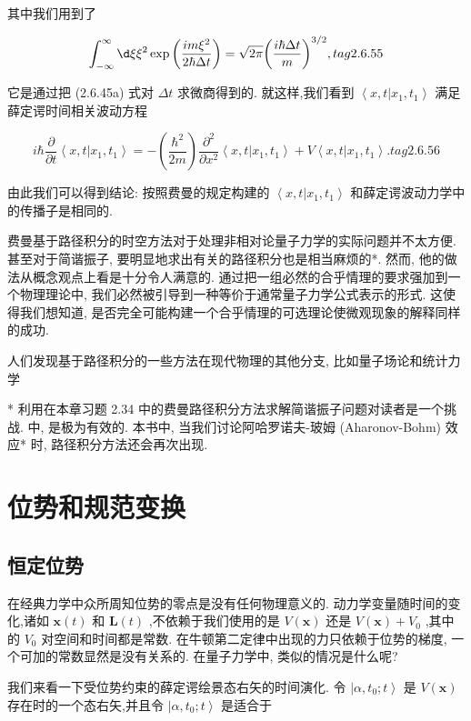 \documentclass[lang=cn,newtx,10pt,scheme=chinese,thmcnt=section]{elegantbook}
\begin{document}
其中我们用到了

$$
\int_{-\infty }^{\infty }{\d \xi }{\xi }^{2}\exp \left( \frac{{im}{\xi }^{2}}{2\hbar {\Delta t}}\right) = \sqrt{2\pi }{\left( \frac{i\hbar {\Delta t}}{m}\right) }^{3/2}, tag{2.6.55}
$$

它是通过把 (2.6.45a) 式对 ${\Delta t}$ 求微商得到的. 就这样,我们看到 $\left\langle {x, t | {x}_{1},{t}_{1}}\right\rangle$ 满足薛定谔时间相关波动方程

$$
i\hbar \frac{\partial }{\partial t}\left\langle {x, t | {x}_{1},{t}_{1}}\right\rangle = - \left( \frac{{\hbar }^{2}}{2m}\right) \frac{{\partial }^{2}}{\partial {x}^{2}}\left\langle {x, t | {x}_{1},{t}_{1}}\right\rangle + V\left\langle {x, t | {x}_{1},{t}_{1}}\right\rangle . tag{2.6.56}
$$

由此我们可以得到结论: 按照费曼的规定构建的 $\left\langle {x, t | {x}_{1},{t}_{1}}\right\rangle$ 和薛定谔波动力学中的传播子是相同的.

费曼基于路径积分的时空方法对于处理非相对论量子力学的实际问题并不太方便. 甚至对于简谐振子, 要明显地求出有关的路径积分也是相当麻烦的*. 然而, 他的做法从概念观点上看是十分令人满意的. 通过把一组必然的合乎情理的要求强加到一个物理理论中, 我们必然被引导到一种等价于通常量子力学公式表示的形式. 这使得我们想知道, 是否完全可能构建一个合乎情理的可选理论使微观现象的解释同样的成功.

人们发现基于路径积分的一些方法在现代物理的其他分支, 比如量子场论和统计力学

* 利用在本章习题 2.34 中的费曼路径积分方法求解简谐振子问题对读者是一个挑战. 中, 是极为有效的. 本书中, 当我们讨论阿哈罗诺夫-玻姆 (Aharonov-Bohm) 效应* 时, 路径积分方法还会再次出现.
\section{位势和规范变换}
\subsection*{恒定位势}
在经典力学中众所周知位势的零点是没有任何物理意义的. 动力学变量随时间的变化,诸如 $\mathbf{x}\left( t\right)$ 和 $\mathbf{L}\left( t\right)$ ,不依赖于我们使用的是 $V\left( \mathbf{x}\right)$ 还是 $V\left( \mathbf{x}\right) + {V}_{0}$ ,其中的 ${V}_{0}$ 对空间和时间都是常数. 在牛顿第二定律中出现的力只依赖于位势的梯度, 一个可加的常数显然是没有关系的. 在量子力学中, 类似的情况是什么呢?

我们来看一下受位势约束的薛定谔绘景态右矢的时间演化. 令 $\left| {\alpha ,{t}_{0};t}\right\rangle$ 是 $V\left( \mathbf{x}\right)$ 存在时的一个态右矢,并且令 $\left| {\alpha ,{t}_{0};t}\right\rangle$ 是适合于
\end{document}
